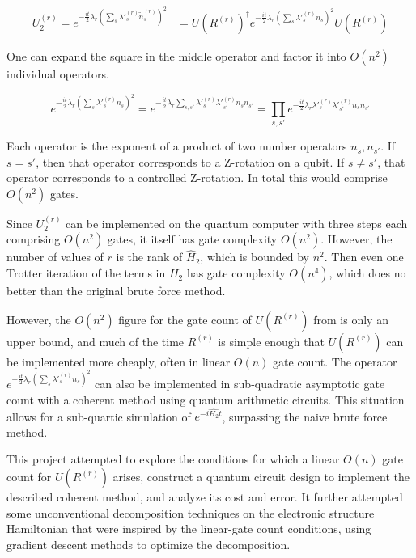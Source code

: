 \begin{equation}
    \begin{split}
        U_2^{(r)} = e^{-\frac{it}{2}\lambda_r(\sum_s \lambda'^{(r)}_s \tilde{n}^{(r)}_s)^2} &= U(R^{(r)})^\dag e^{-\frac{it}{2}\lambda_r(\sum_s \lambda'^{(r)}_s n_s)^2}U(R^{(r)})
    \end{split}
\end{equation}

One can expand the square in the middle operator and factor it into $O(n^2)$ individual operators.

\begin{equation}
    e^{-\frac{it}{2}\lambda_r(\sum_s \lambda'^{(r)}_s n_s)^2} = e^{-\frac{it}{2}\lambda_r\sum_{s, s'} \lambda'^{(r)}_s\lambda'^{(r)}_{s'} n_sn_{s'}} = \prod_{s, s'} e^{-\frac{it}{2}\lambda_r\lambda'^{(r)}_s\lambda'^{(r)}_{s'} n_sn_{s'}}
\end{equation}

Each operator is the exponent of a product of two number operators $n_s, n_{s'}$. If $s = s'$, then that operator corresponds to a Z-rotation on a qubit. If $s \neq s'$, that operator corresponds to a controlled Z-rotation. In total this would comprise $O(n^2)$ gates.

Since $U_2^{(r)}$ can be implemented on the quantum computer with three steps each comprising $O(n^2)$ gates, it itself has gate complexity $O(n^2)$. However, the number of values of $r$ is the rank of $\hat{H}_2$, which is bounded by $n^2$. Then even one Trotter iteration of the terms in $H_2$ has gate complexity $O(n^4)$, which does no better than the original brute force method.

However, the $O(n^2)$ figure for the gate count of $U(R^{(r)})$ from \cite{FSN} is only an upper bound, and much of the time $R^{(r)}$ is simple enough that $U(R^{(r)})$ can be implemented more cheaply, often in linear $O(n)$ gate count. The operator $e^{-\frac{it}{2}\lambda_r(\sum_s \lambda'^{(r)}_s n_s)^2}$ can also be implemented in sub-quadratic asymptotic gate count with a coherent method using quantum arithmetic circuits. This situation allows for a sub-quartic simulation of $e^{-i\hat{H_2}t}$, surpassing the naive brute force method.

This project attempted to explore the conditions for which a linear $O(n)$ gate count for $U(R^{(r)})$ arises, construct a quantum circuit design to implement the described coherent method, and analyze its cost and error. It further attempted some unconventional decomposition techniques on the electronic structure Hamiltonian that were inspired by the linear-gate count conditions, using gradient descent methods to optimize the decomposition.


